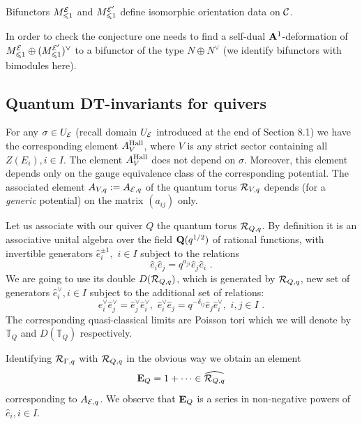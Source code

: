 \documentclass[12pt]{article}
\begin{document}
\begin{conj} Bifunctors $M_{\leqslant 1}^{\cal E}$ and $M_{\leqslant 1}^{{\cal E}^{\prime}}$ define isomorphic orientation data on ${\mathcal C}$.


\end{conj}

In order to check the conjecture one needs to find a self-dual ${\bf A}^1$-deformation of $M_{\leqslant 1}^{\cal E}\oplus  (M_{\leqslant 1}^{{\cal E}^{\prime}})^{\vee}$ to a bifunctor of the type $N\oplus N^{\vee}$ (we identify bifunctors with bimodules here).





\subsection{Quantum DT-invariants for quivers}

For any $\sigma\in U_{{\cal E}}$ (recall domain $U_{{\cal E}}$ introduced at the end of Section 8.1) we have the corresponding element $A_V^{\operatorname{Hall}}$, where $V$ is any strict sector containing all $Z(E_i), i\in I$. The element $A_V^{\operatorname{Hall}}$ does not depend on $\sigma$. Moreover,  this element depends only on the gauge equivalence class of the corresponding potential. The associated element $A_{V,q}:=A_{{\cal E},q}$ of the quantum torus ${\cal R}_{V,q}$ depends (for a {\it generic} potential) on the matrix $(a_{ij})$ only.

Let us associate with our quiver $Q$ the quantum torus ${\cal R}_{Q,q}$. By definition it is an associative unital algebra over the field ${\bf Q}(q^{1/2})$ of rational functions, with invertible generators $\hat{e}_i^{\pm 1},\,\,i\in I$ subject to the relations
$$\hat{e}_i\hat{e}_j=q^{a_{ji}}\hat{e}_j\hat{e}_i\,\,.$$
We are going to use its double $D({\cal R}_{Q,q})$, which is generated by ${\cal R}_{Q,q}$, new set of generators $\hat{e}_i^{\vee}, i\in I$ subject to the additional set of relations:
$$\hat{e}_i^{\vee}\hat{e}_j^{\vee}=\hat{e}_j^{\vee}\hat{e}_i^{\vee}, \,\,\hat{e}_i^{\vee}\hat{e}_j=q^{-\delta_{ij}}\hat{e}_j \hat{e}_i^{\vee}, \,\,i,j\in I\,\,.$$
The corresponding quasi-classical limits are Poisson tori which we will denote by ${\mathbb T}_Q$ and
$D({\mathbb T}_Q)$ respectively.



Identifying ${\cal R}_{\Gamma,q}$ with ${\cal R}_{Q,q}$ in the obvious way we obtain an element
$${\bf E}_Q=1+\dots\in \widehat{{\cal R}_{Q,q}}$$
corresponding to $A_{{\cal E},q}$. We observe that ${\bf E}_Q$ is a series in non-negative powers of $\hat{e}_i,i\in I$.
\end{document}
